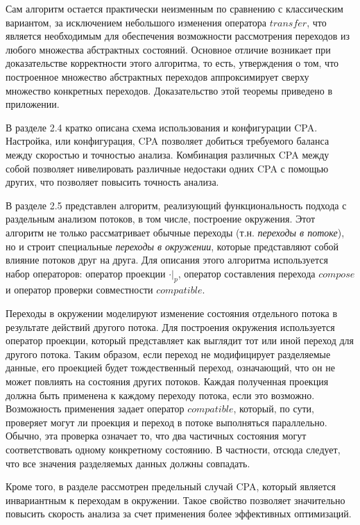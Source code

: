 Сам алгоритм остается практически неизменным по сравнению с классическим вариантом, за исключением небольшого изменения оператора $transfer$, что является необходимым для обеспечения возможности рассмотрения переходов из любого множества абстрактных состояний. 
Основное отличие возникает при доказательстве корректности этого алгоритма, то есть, утверждения о том, что построенное множество абстрактных переходов аппроксимирует сверху множество конкретных переходов.
Доказательство этой теоремы приведено в приложении.

В разделе 2.4 кратко описана схема использования и конфигурации CPA. 
Настройка, или конфигурация, CPA позволяет добиться требуемого баланса между скоростью и точностью анализа. 
Комбинация различных CPA между собой позволяет нивелировать различные недостаки одних CPA с помощью других, что позволяет повысить точность анализа.
 
В разделе 2.5 представлен алгоритм, реализующий функциональность подхода с раздельным анализом потоков, в том числе, построение окружения.
Этот алгоритм не только рассматривает обычные переходы (т.н. \textit{переходы в потоке}), но и строит специальные \textit{переходы в окружении}, которые представляют собой влияние потоков друг на друга.
Для описания этого алгоритма используется набор операторов: оператор проекции $\cdot|_p$, оператор составления перехода $compose$ и оператор проверки совместности $compatible$.

Переходы в окружении моделируют изменение состояния отдельного потока в результате действий другого потока.
Для построения окружения используется оператор проекции, который представляет как выглядит тот или иной переход для другого потока.
Таким образом, если переход не модифицирует разделяемые данные, его проекцией будет тождественный переход, означающий, что он не может повлиять на состояния других потоков.
Каждая полученная проекция должна быть применена к каждому переходу потока, если это возможно.
Возможность применения задает оператор $compatible$, который, по сути, проверяет могут ли проекция и переход в потоке выполняться параллельно. 
Обычно, эта проверка означает то, что два частичных состояния могут соответствовать одному конкретному состоянию.
В частности, отсюда следует, что все значения разделяемых данных должны совпадать.

Кроме того, в разделе рассмотрен предельный случай CPA, который является инвариантным к переходам в окружении.
Такое свойство позволяет значительно повысить скорость анализа за счет применения более эффективных оптимизаций.

